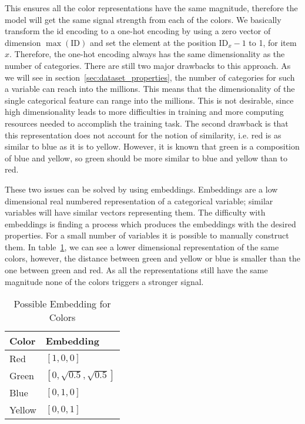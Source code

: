 This ensures all the color representations have the same magnitude, therefore the model will get the same signal strength from each of the colors.
We basically transform the id encoding to a one-hot encoding by using a zero vector of dimension $\max(\text{ID})$ and set the element at the position $\text{ID}_x-1$ to 1, for item $x$.
Therefore, the one-hot encoding always has the same dimensionality as the number of categories.
There are still two major drawbacks to this approach.
As we will see in section~\ref{sec:dataset_properties}, the number of categories for such a variable can reach into the millions.
This means that the dimensionality of the single categorical feature can range into the millions.
This is not desirable, since high dimensionality leads to more difficulties in training and more computing resources needed to accomplish the training task.
The second drawback is that this representation does not account for the notion of similarity, i.e. red is as similar to blue as it is to yellow.
However, it is known that green is a composition of blue and yellow, so green should be more similar to blue and yellow than to red.
\par
These two issues can be solved by using embeddings.
Embeddings are a low dimensional real numbered representation of a categorical variable; similar variables will have similar vectors representing them.
The difficulty with embeddings is finding a process which produces the embeddings with the desired properties.
For a small number of variables it is possible to manually construct them.
In table~\ref{tab:embedding}, we can see a lower dimensional representation of the same colors, however, the distance between green and yellow or blue is smaller than the one between green and red.
As all the representations still have the same magnitude none of the colors triggers a stronger signal.
\begin{table}[ht]
    \centering
    \begin{tabular}{ll}\toprule
    
    \textbf{Color} & \textbf{Embedding} \\ \midrule
    Red & $[1,0,0]$ \\
    Green & $[0,\sqrt{0.5},\sqrt{0.5}]$ \\
    Blue & $[0,1,0]$ \\
    Yellow & $[0,0,1]$ \\ \bottomrule
    \end{tabular}
    \caption{Possible Embedding for Colors}
    \label{tab:embedding}
\end{table}

